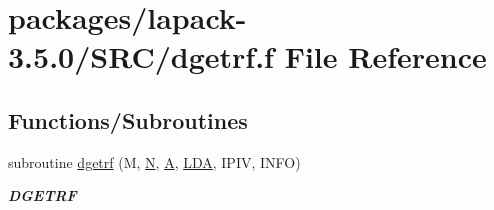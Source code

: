 \hypertarget{dgetrf_8f}{}\section{packages/lapack-\/3.5.0/\+S\+R\+C/dgetrf.f File Reference}
\label{dgetrf_8f}
\subsection*{Functions/\+Subroutines}
\begin{DoxyCompactItemize}
\item 
subroutine \hyperlink{group__doubleGEcomputational_ga0019443faea08275ca60a734d0593e60}{dgetrf} (M, \hyperlink{polmisc_8c_a0240ac851181b84ac374872dc5434ee4}{N}, \hyperlink{classA}{A}, \hyperlink{example__user_8c_ae946da542ce0db94dced19b2ecefd1aa}{L\+D\+A}, I\+P\+I\+V, I\+N\+F\+O)
\begin{DoxyCompactList}\small\item\em {\bfseries D\+G\+E\+T\+R\+F} \end{DoxyCompactList}\end{DoxyCompactItemize}
